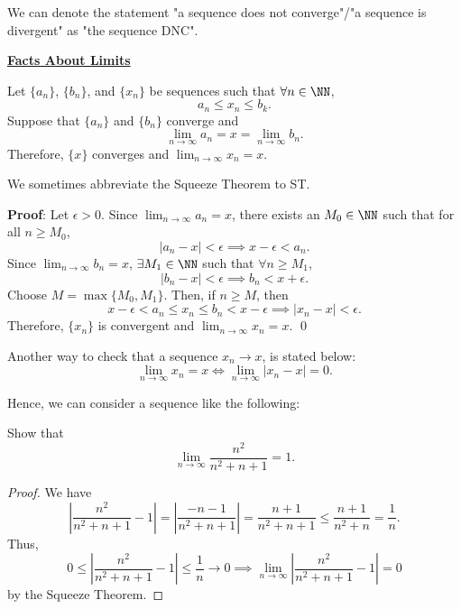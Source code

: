 \begin{notation}[DNC]
We can denote the statement "a sequence does not converge"/"a sequence is divergent" as "the sequence DNC".
\end{notation}



\noindent\underline{\textbf{Facts About Limits}}

\begin{theorem}
Let $\{a_n\}$, $\{b_n\}$, and $\{x_n\}$ be sequences such that $\forall n\in \NN$,
\[
a_n \leq x_n \leq b_k.
\]
Suppose that $\{a_n\}$ and $\{b_n\}$ converge and 
\[
\lim_{n\to \infty}a_n = x = \lim_{n\to \infty}b_n.
\]
Therefore, $\{x\}$ converges and $\lim_{n\to \infty}x_n = x$.
\end{theorem}
\begin{remark}
We sometimes abbreviate the Squeeze Theorem to ST.
\end{remark}

\textbf{Proof}: Let $\epsilon>0$. Since $\lim_{n\to \infty} a_n = x$, there exists an $M_0\in \NN$ such that for all $n\geq M_0$, 
\[
|a_n-x| <\epsilon \implies x-\epsilon <a_n.
\]
Since $\lim_{n\to \infty}b_n = x$, $\exists M_1 \in \NN$ such that $\forall n\geq M_1$, 
\[
|b_n - x| < \epsilon \implies b_n < x+\epsilon.
\]
Choose $M = \max\{M_0, M_1\}$. Then, if $n\geq M$, then
\[
x-\epsilon < a_n \leq x_n \leq b_n < x-\epsilon \implies |x_n-x|<\epsilon.
\]
Therefore, $\{x_n\}$ is convergent and $\lim_{n\to \infty}x_n = x.$
\qed

\begin{theorem}
Another way to check that a sequence $x_n\to x$, is stated below:
\[
\lim_{n\to \infty}x_n = x \iff \lim_{n\to \infty}|x_n-x| = 0.
\]
\end{theorem}

Hence, we can consider a sequence like the following:
\begin{example}
Show that 
\[
\lim_{n\to \infty} \frac{n^2}{n^2+n+1} = 1.
\]
\end{example}
\begin{proof}
We have 
\[
\left|\frac{n^2}{n^2 + n + 1} - 1\right| = \left|\frac{-n-1}{n^2+n+1}\right| = \frac{n+1}{n^2+n+1} \leq \frac{n+1}{n^2+n} = \frac{1}{n}.
\] 
Thus,
\[
0 \leq \left|\frac{n^2}{n^2 + n + 1} - 1\right| \leq \frac{1}{n}\to 0\implies \lim_{n\to \infty} \left|\frac{n^2}{n^2 + n + 1} - 1\right| = 0
\]
by the Squeeze Theorem.
\end{proof}

